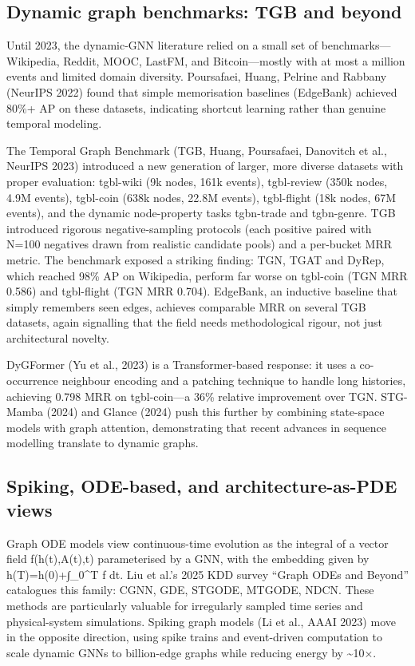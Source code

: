 \documentclass{article}
\begin{document}
\subsection{Dynamic graph benchmarks: TGB and beyond}\label{dynamic-graph-benchmarks-tgb-and-beyond}

Until 2023, the dynamic-GNN literature relied on a small set of benchmarks---Wikipedia, Reddit, MOOC, LastFM, and Bitcoin---mostly with at most a million events and limited domain diversity. Poursafaei, Huang, Pelrine and Rabbany (NeurIPS 2022) found that simple memorisation baselines (EdgeBank) achieved 80\%+ AP on these datasets, indicating shortcut learning rather than genuine temporal modeling.

The Temporal Graph Benchmark (TGB, Huang, Poursafaei, Danovitch et al., NeurIPS 2023) introduced a new generation of larger, more diverse datasets with proper evaluation: tgbl-wiki (9k nodes, 161k events), tgbl-review (350k nodes, 4.9M events), tgbl-coin (638k nodes, 22.8M events), tgbl-flight (18k nodes, 67M events), and the dynamic node-property tasks tgbn-trade and tgbn-genre. TGB introduced rigorous negative-sampling protocols (each positive paired with N=100 negatives drawn from realistic candidate pools) and a per-bucket MRR metric. The benchmark exposed a striking finding: TGN, TGAT and DyRep, which reached 98\% AP on Wikipedia, perform far worse on tgbl-coin (TGN MRR 0.586) and tgbl-flight (TGN MRR 0.704). EdgeBank, an inductive baseline that simply remembers seen edges, achieves comparable MRR on several TGB datasets, again signalling that the field needs methodological rigour, not just architectural novelty.

DyGFormer (Yu et al., 2023) is a Transformer-based response: it uses a co-occurrence neighbour encoding and a patching technique to handle long histories, achieving 0.798 MRR on tgbl-coin---a 36\% relative improvement over TGN. STG-Mamba (2024) and Glance (2024) push this further by combining state-space models with graph attention, demonstrating that recent advances in sequence modelling translate to dynamic graphs.

\subsection{Spiking, ODE-based, and architecture-as-PDE views}\label{spiking-ode-based-and-architecture-as-pde-views}

Graph ODE models view continuous-time evolution as the integral of a vector field f(h(t),A(t),t) parameterised by a GNN, with the embedding given by h(T)=h(0)+∫\_0\^{}T f dt. Liu et al.'s 2025 KDD survey ``Graph ODEs and Beyond'' catalogues this family: CGNN, GDE, STGODE, MTGODE, NDCN. These methods are particularly valuable for irregularly sampled time series and physical-system simulations. Spiking graph models (Li et al., AAAI 2023) move in the opposite direction, using spike trains and event-driven computation to scale dynamic GNNs to billion-edge graphs while reducing energy by \textasciitilde10×.
\end{document}
